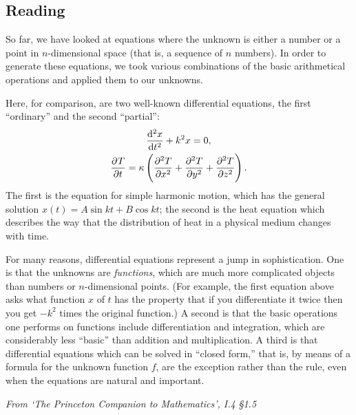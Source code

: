 


\subsection*{Reading}
So far, we have looked at equations where the unknown is either a number or a point in $ n$-dimensional space (that is, a sequence of $ n $ numbers).
In order to generate these equations, we took various combinations of the basic arithmetical operations and applied them to our unknowns.

Here, for comparison, are two well-known differential equations, the first ``ordinary'' and the second ``partial'':
\begin{gather*}
  \dod[2]{x}{t} + k^2 x = 0,\\
  \dpd{T}{t} = \kappa\left( \dpd[2]{T}{x} + \dpd[2]{T}{y} + \dpd[2]{T}{z} \right).
\end{gather*}
The first is the equation for simple harmonic motion, which has the general solution $ x(t) = A\sin kt + B\cos kt $;
the second is the heat equation which describes the way that the distribution of heat in a physical medium changes with
time.

For many reasons, differential equations represent a jump in sophistication. One is that the unknowns are \emph{functions},
which are much more complicated objects than numbers or $ n$-dimensional points. (For example, the first equation above
asks what function $ x $ of $ t $ has the property that if you differentiate it twice then you get $ -k^2 $ times the original
function.) A second is that the basic operations one performs on functions include differentiation and integration, which are
considerably less ``basic'' than addition and multiplication. A third is that differential equations which can be solved
in ``closed form,'' that is, by means of a formula for the unknown function $ f $, are the exception rather than the rule, even
when the equations are natural and important.

\textit{From `The Princeton Companion to Mathematics', I.4 \S 1.5}

